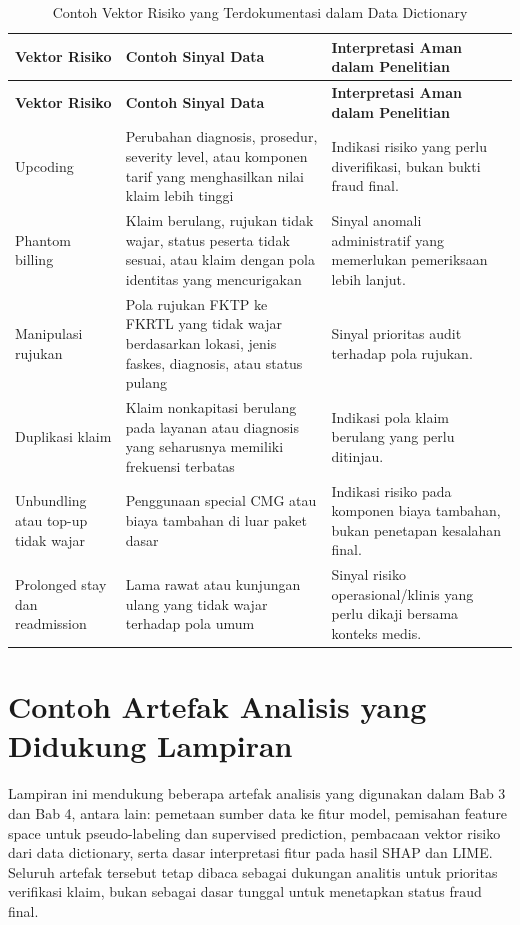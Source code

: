\begin{longtable}[]{@{}p{}p{}p{}@{}}
\caption{Contoh Vektor Risiko yang Terdokumentasi dalam Data Dictionary}\label{tab:lampiran-vektor-risiko}\\
\toprule
\textbf{Vektor Risiko} & \textbf{Contoh Sinyal Data} & \textbf{Interpretasi Aman dalam Penelitian} \\
\midrule
\endfirsthead
\toprule
\textbf{Vektor Risiko} & \textbf{Contoh Sinyal Data} & \textbf{Interpretasi Aman dalam Penelitian} \\
\midrule
\endhead
\bottomrule
\endfoot
Upcoding & Perubahan diagnosis, prosedur, severity level, atau komponen tarif yang menghasilkan nilai klaim lebih tinggi & Indikasi risiko yang perlu diverifikasi, bukan bukti fraud final. \\
Phantom billing & Klaim berulang, rujukan tidak wajar, status peserta tidak sesuai, atau klaim dengan pola identitas yang mencurigakan & Sinyal anomali administratif yang memerlukan pemeriksaan lebih lanjut. \\
Manipulasi rujukan & Pola rujukan FKTP ke FKRTL yang tidak wajar berdasarkan lokasi, jenis faskes, diagnosis, atau status pulang & Sinyal prioritas audit terhadap pola rujukan. \\
Duplikasi klaim & Klaim nonkapitasi berulang pada layanan atau diagnosis yang seharusnya memiliki frekuensi terbatas & Indikasi pola klaim berulang yang perlu ditinjau. \\
Unbundling atau top-up tidak wajar & Penggunaan special CMG atau biaya tambahan di luar paket dasar & Indikasi risiko pada komponen biaya tambahan, bukan penetapan kesalahan final. \\
Prolonged stay dan readmission & Lama rawat atau kunjungan ulang yang tidak wajar terhadap pola umum & Sinyal risiko operasional/klinis yang perlu dikaji bersama konteks medis. \\
\end{longtable}

\section{Contoh Artefak Analisis yang Didukung Lampiran}

Lampiran ini mendukung beberapa artefak analisis yang digunakan dalam Bab 3 dan Bab 4, antara lain: pemetaan sumber data ke fitur model, pemisahan feature space untuk pseudo-labeling dan supervised prediction, pembacaan vektor risiko dari data dictionary, serta dasar interpretasi fitur pada hasil SHAP dan LIME. Seluruh artefak tersebut tetap dibaca sebagai dukungan analitis untuk prioritas verifikasi klaim, bukan sebagai dasar tunggal untuk menetapkan status fraud final.
